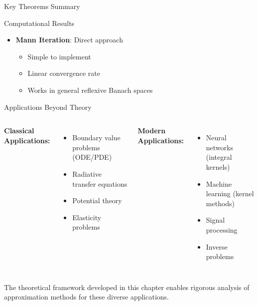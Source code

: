 \documentclass[aspectratio=169,10pt]{beamer}
\begin{document}
\begin{frame}[allowframebreaks]{Key Theorems Summary}
\begin{block}{Computational Results}
\begin{itemize}
            \item \textbf{Mann Iteration}: Direct approach
                \begin{itemize}
                    \item Simple to implement
                    \item Linear convergence rate
                    \item Works in general reflexive Banach spaces
                \end{itemize}
        \end{itemize}
    \end{block}
\end{frame}

\begin{frame}{Applications Beyond Theory}
    \begin{columns}[T]
        \textbf{Classical Applications:}
        \begin{itemize}
            \item Boundary value problems (ODE/PDE)
            \item Radiative transfer equations
            \item Potential theory
            \item Elasticity problems
        \end{itemize}

        \textbf{Modern Applications:}
        \begin{itemize}
            \item Neural networks (integral kernels)
            \item Machine learning (kernel methods)
            \item Signal processing
            \item Inverse problems
        \end{itemize}
    \end{columns}

    \vspace{0.5cm}
    \begin{remark}
        The theoretical framework developed in this chapter enables rigorous analysis
        of approximation methods for these diverse applications.
    \end{remark}
\end{frame}
\end{document}
